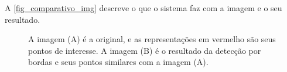 A \autoref{fig_comparativo_img} descreve o que o sistema faz com a imagem e o seu resultado.

\begin{figure}[h]
	\caption{\label{fig_comparativo_img}A imagem (A) é a original, e as representações em vermelho são seus pontos de interesse. A imagem (B) é o resultado da detecção por bordas e seus pontos similares com a imagem (A).}
	\begin{center}
	\end{center}
	\centering {}
\end{figure}